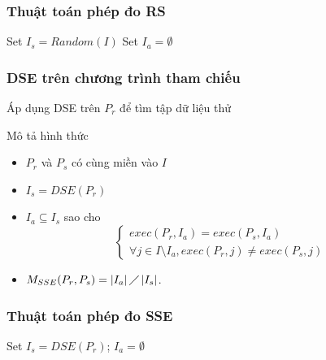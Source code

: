 \documentclass{beamer}
\begin{document}
\begin{frame}
  \frametitle{Thuật toán phép đo RS}
  \begin{algorithm}[H]
	Set $I_s = Random(I)$ \;
	Set $I_a = \emptyset$\;
  	{  			
  	}
  \end{algorithm}
\end{frame}


\begin{frame}
  \frametitle{DSE trên chương trình tham chiếu}
  Áp dụng DSE trên $ P_r $ để tìm tập dữ liệu thử  
	\begin{block}{Mô tả hình thức}
	\begin{itemize}
		\item $P_r$ và $P_s$ có cùng miền vào $I$
		\item $I_{s} = DSE(P_r)$
		\item $I_{a} \subseteq I_s$ sao cho
		\[\begin{cases}
		exec(P_r, I_{a}) = exec(P_s, I_{a})\\
		\forall j \in I \setminus I_{a}, exec(P_r, j) \neq exec(P_s, j)			
		\end{cases}
		\]		
		\item $M_{SSE}(P_r, P_s) = \left|I_{a}\right| \diagup
		\left|I_{s}\right| $.
	\end{itemize}
	\end{block}
\end{frame}


\begin{frame}
  \frametitle{Thuật toán phép đo SSE}
  \begin{algorithm}[H]
  	Set $I_s = DSE(P_r)$; $I_a = \emptyset$ \;
  	{  			
  	}
  \end{algorithm}
\end{frame}
\end{document}
